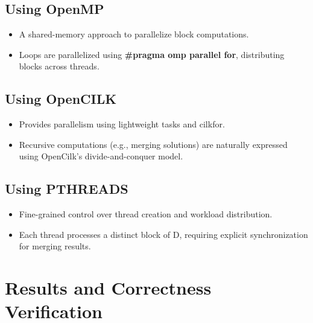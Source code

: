 \documentclass[12pt]{report}
\begin{document}
\section{Using OpenMP}
\begin{itemize}
    \item A shared-memory approach to parallelize block computations.
    \item Loops are parallelized using \textbf{\#pragma omp parallel for}, distributing blocks across threads.
\end{itemize}

\section{Using OpenCILK}
\begin{itemize}
    \item Provides parallelism using lightweight tasks and cilkfor.
    \item Recursive computations (e.g., merging solutions) are naturally expressed using OpenCilk's divide-and-conquer model.
\end{itemize}

\section{Using PTHREADS}
\begin{itemize}
    \item Fine-grained control over thread creation and workload distribution.
    \item Each thread processes a distinct block of D, requiring explicit synchronization for merging results.
\end{itemize}

\chapter{Results and Correctness Verification}
\end{document}
